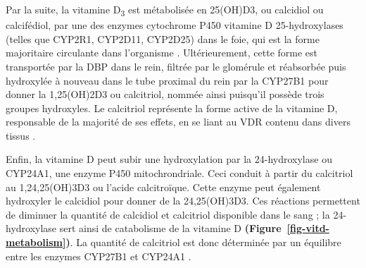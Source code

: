 \documentclass[
  a4paper,
  DIV=11,
  numbers=noendperiod,
  listof=totoc]{scrreprt}
\begin{document}
Par la suite, la vitamine D\textsubscript{3} est métabolisée en
\ac{25(OH)D3}, ou calcidiol ou calcifédiol, par une des enzymes
cytochrome P450 vitamine D 25-hydroxylases (telles que CYP2R1, CYP2D11,
CYP2D25) dans le foie, qui est la forme majoritaire circulante dans
l'organisme \autocite{Norman.2008,Christakos.2010}. Ultérieurement,
cette forme est transportée par la \ac{DBP} dans le rein, filtrée par le
glomérule et réabsorbée puis hydroxylée à nouveau dans le tube proximal
du rein par la \ac{CYP27B1} pour donner la \ac{1,25(OH)2D3} ou
calcitriol, nommée ainsi puisqu'il possède trois groupes hydroxyles. Le
calcitriol représente la forme active de la vitamine D, responsable de
la majorité de ses effets, en se liant au \ac{VDR} contenu dans divers
tissus \autocite{Norman.2008,Dankers.2017}.

Enfin, la vitamine D peut subir une hydroxylation par la 24-hydroxylase
ou \acs{CYP24A1}, une enzyme P450 mitochrondriale. Ceci conduit à partir
du calcitriol au \acs{1,24,25(OH)3D3} ou l'acide calcitroïque. Cette
enzyme peut également hydroxyler le calcidiol pour donner de la
\ac{24,25(OH)3D3}. Ces réactions permettent de diminuer la quantité de
calcidiol et calcitriol disponible dans le sang ; la 24-hydroxylase sert
ainsi de catabolisme de la vitamine D \autocite{Norman.2008}
\textbf{(Figure~\ref{fig-vitd-metabolism})}. La quantité de calcitriol
est donc déterminée par un équilibre entre les enzymes \ac{CYP27B1} et
\ac{CYP24A1} \autocite{Dankers.2017}.
\end{document}
